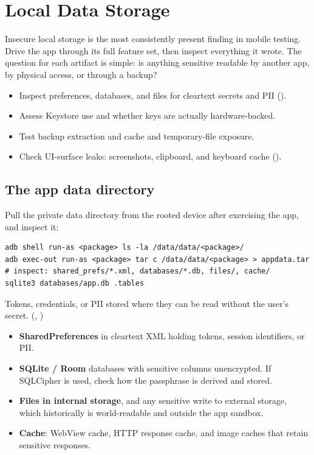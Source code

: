 \chapter{Local Data Storage}\label{ch:storage}

Insecure local storage is the most consistently present finding in mobile testing. Drive the app through its full feature set, then inspect everything it wrote. The question for each artifact is simple: is anything sensitive readable by another app, by physical access, or through a backup?

\begin{objectives}
\begin{itemize}[leftmargin=12pt]
\item Inspect preferences, databases, and files for cleartext secrets and PII ().
\item Assess Keystore use and whether keys are actually hardware-backed.
\item Test backup extraction and cache and temporary-file exposure.
\item Check UI-surface leaks: screenshots, clipboard, and keyboard cache ().
\end{itemize}
\end{objectives}

\section{The app data directory}
Pull the private data directory from the rooted device after exercising the app, and inspect it:

\begin{lstlisting}
adb shell run-as <package> ls -la /data/data/<package>/
adb exec-out run-as <package> tar c /data/data/<package> > appdata.tar
# inspect: shared_prefs/*.xml, databases/*.db, files/, cache/
sqlite3 databases/app.db .tables
\end{lstlisting}

\begin{findingbox}
Tokens, credentials, or PII stored where they can be read without the user's secret. (, )
\end{findingbox}

\begin{itemize}
\item \textbf{SharedPreferences} in cleartext XML holding tokens, session identifiers, or PII.
\item \textbf{SQLite / Room} databases with sensitive columns unencrypted. If SQLCipher is used, check how the passphrase is derived and stored.
\item \textbf{Files in internal storage}, and any sensitive write to external storage, which historically is world-readable and outside the app sandbox.
\item \textbf{Cache}: WebView cache, HTTP response cache, and image caches that retain sensitive responses.
\end{itemize}

